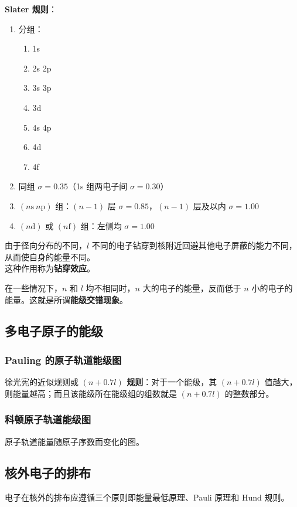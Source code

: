 \textbf{Slater 规则}：
\begin{enumerate}
    \item 分组：
    \begin{enumerate}
        \item 1s
        \item 2s 2p
        \item 3s 3p
        \item 3d
        \item 4s 4p
        \item 4d
        \item 4f
    \end{enumerate}
    \item 同组 $\sigma = 0.35$（1s 组两电子间 $\sigma = 0.30$）
    \item $(n\mathrm{s}~n\mathrm{p})$ 组：$(n-1)$ 层 $\sigma = 0.85$，$(n-1)$ 层及以内 $\sigma = 1.00$
    \item $(n\mathrm{d})$ 或 $(n\mathrm{f})$ 组：左侧均 $\sigma = 1.00$
\end{enumerate}

由于径向分布的不同，$l$ 不同的电子钻穿到核附近回避其他电子屏蔽的能力不同，从而使自身的能量不同。\\
这种作用称为\textbf{钻穿效应}。

在一些情况下，$n$ 和 $l$ 均不相同时，$n$ 大的电子的能量，反而低于 $n$ 小的电子的能量。这就是所谓\textbf{能级交错现象}。

\subsection{多电子原子的能级}

\subsubsection{Pauling 的原子轨道能级图}
徐光宪的近似规则或 \textbf{$(n + 0.7l)$ 规则}：对于一个能级，其 $(n + 0.7l)$ 值越大，则能量越高；而且该能级所在能级组的组数就是 $(n + 0.7l)$ 的整数部分。

\subsubsection{科顿原子轨道能级图}
原子轨道能量随原子序数而变化的图。

\subsection{核外电子的排布}
电子在核外的排布应遵循三个原则即能量最低原理、Pauli 原理和 Hund 规则。

